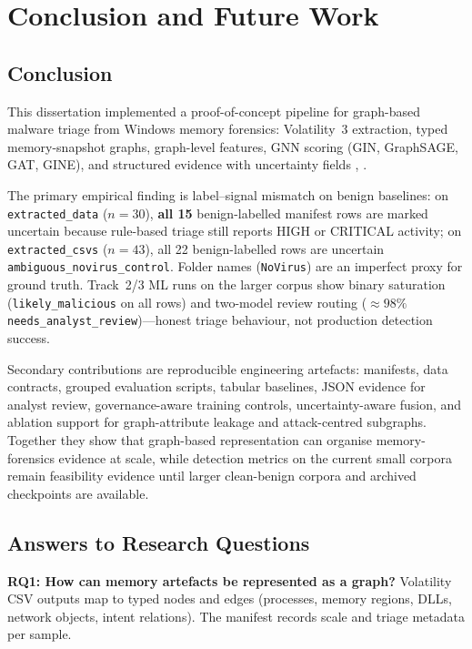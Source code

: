 \chapter{Conclusion and Future Work}

\section{Conclusion}

This dissertation implemented a proof-of-concept pipeline for graph-based malware triage from Windows memory forensics: Volatility~3 extraction, typed memory-snapshot graphs, graph-level features, GNN scoring (GIN, GraphSAGE, GAT, GINE), and structured evidence with uncertainty fields \cite{volatility3docs}, \cite{fey2019pyg}.

The primary empirical finding is label--signal mismatch on benign baselines: on \texttt{extracted\_data} ($n{=}30$), \textbf{all 15} benign-labelled manifest rows are marked uncertain because rule-based triage still reports HIGH or CRITICAL activity; on \texttt{extracted\_csvs} ($n{=}43$), all 22 benign-labelled rows are uncertain \texttt{ambiguous\_novirus\_control}. Folder names (\texttt{NoVirus}) are an imperfect proxy for ground truth. Track~2/3 ML runs on the larger corpus show binary saturation (\texttt{likely\_malicious} on all rows) and two-model review routing (${\approx}98\%$ \texttt{needs\_analyst\_review})---honest triage behaviour, not production detection success.

Secondary contributions are reproducible engineering artefacts: manifests, data contracts, grouped evaluation scripts, tabular baselines, JSON evidence for analyst review, governance-aware training controls, uncertainty-aware fusion, and ablation support for graph-attribute leakage and attack-centred subgraphs. Together they show that graph-based representation can organise memory-forensics evidence at scale, while detection metrics on the current small corpora remain feasibility evidence until larger clean-benign corpora and archived checkpoints are available.

\section{Answers to Research Questions}

\textbf{RQ1: How can memory artefacts be represented as a graph?} Volatility CSV outputs map to typed nodes and edges (processes, memory regions, DLLs, network objects, intent relations). The manifest records scale and triage metadata per sample.

